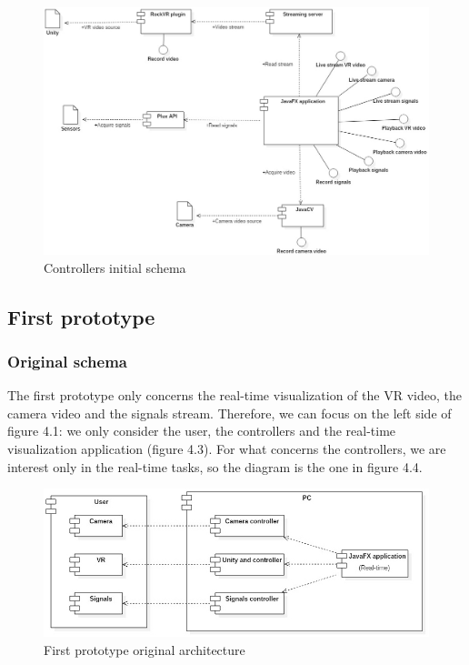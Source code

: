 \documentclass[binding=0.6cm,LaM]{sapthesis}
\begin{document}
\begin{figure}
\centering
\includegraphics[scale=.57, angle=90]{images/2_controllers2}
\caption{Controllers initial schema}
\end{figure}

\subsection{First prototype}

\subsubsection{Original schema}
The first prototype only concerns the real-time visualization of the VR video, the camera video and the signals stream. Therefore, we can focus on the left side of figure 4.1: we only consider the user, the controllers and the real-time visualization application (figure 4.3). For what concerns the controllers, we are interest only in the real-time tasks, so the diagram is the one in figure 4.4.

\begin{figure}
\centering
\includegraphics[scale=.5]{images/prot1_initial_design}
\caption{First prototype original architecture}
\end{figure}
\end{document}
